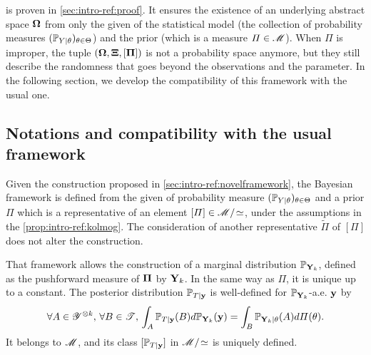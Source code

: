 
 is proven in \cref{sec:intro-ref:proof}. It ensures the existence of an underlying abstract space $\mathbf{\Omega}$
from only the given of the statistical model (the collection of probability measures $(\mathbb{P}_{Y|\theta})_{\theta\in\Theta}$) and the prior (which is a measure $\varPi\in\mathscr{M}$). When $\varPi$ is improper, the  tuple $(\mathbf{\Omega},\mathbf{\Xi},[\mathbf{\Pi}])$ is not a probability space anymore, %
but they still describe the randomness that goes beyond the observations and the parameter.
In the following section, we develop the compatibility of this framework with the usual one.











\subsection{Notations and compatibility with the usual framework}\label{sec:intro-ref:frameworkcompatibility}


Given the construction proposed in \cref{sec:intro-ref:novelframework}, the Bayesian framework is defined from the given of probability measure $(\mathbb{P}_{Y|\theta})_{\theta\in\Theta}$ and a prior $\varPi$ which is a representative of an element $[\varPi]\in\mathscr{M}/\!\simeq$, under the assumptions in the \cref{prop:intro-ref:kolmog}.
The consideration of another representative $\tilde\varPi$ of  $[\varPi]$ does not alter the construction.



That framework allows the construction of a marginal distribution $\mathbb{P}_{\mathbf{Y}_k}$, defined as the pushforward measure of $\mathbf{\Pi}$ by $\mathbf{Y}_k$.
In the same way as $\varPi$, it is unique up to a constant.
The posterior distribution $\mathbb{P}_{T|\mathbf{y}}$ is well-defined for $\mathbb{P}_{\mathbf{Y}_k}$-a.e. $\mathbf{y}$ by
\begin{equation}
    \forall A\in\mathscr{Y}^{\otimes k},\,\forall B\in\mathscr{T},\, \int_{A}\mathbb{P}_{T|\mathbf{y}}(B)d\mathbb{P}_{\mathbf{Y}_k}(\mathbf{y}) = \int_B \mathbb{P}_{\mathbf{Y}_k|\theta}(A)d\varPi(\theta).
\end{equation}
It belongs to $\mathscr{M}$, and its class $[\mathbb{P}_{T|\mathbf{y}}]$  in $\mathscr{M}/\!\simeq$ is uniquely defined.


